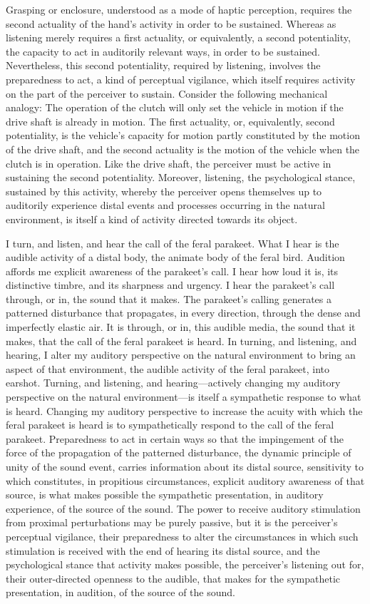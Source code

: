 Grasping or enclosure, understood as a mode of haptic perception, requires the second actuality of the hand's activity in order to be sustained. Whereas as listening merely requires a first actuality, or equivalently, a second potentiality, the capacity to act in auditorily relevant ways, in order to be sustained. Nevertheless, this second potentiality, required by listening, involves the preparedness to act, a kind of perceptual vigilance, which itself requires activity on the part of the perceiver to sustain. Consider the following mechanical analogy: The operation of the clutch will only set the vehicle in motion if the drive shaft is already in motion. The first actuality, or, equivalently, second potentiality, is the vehicle's capacity for motion partly constituted by the motion of the drive shaft, and the second actuality is the motion of the vehicle when the clutch is in operation. Like the drive shaft, the perceiver must be active in sustaining the second potentiality. Moreover, listening, the psychological stance, sustained by this activity, whereby the perceiver opens themselves up to auditorily experience distal events and processes occurring in the natural environment, is itself a kind of activity directed towards its object.

I turn, and listen, and hear the call of the feral parakeet. What I hear is the audible activity of a distal body, the animate body of the feral bird. Audition affords me explicit awareness of the parakeet's call. I hear how loud it is, its distinctive timbre, and its sharpness and urgency. I hear the parakeet's call through, or in, the sound that it makes. The parakeet's calling generates a patterned disturbance that propagates, in every direction, through the dense and imperfectly elastic air. It is through, or in, this audible media, the sound that it makes, that the call of the feral parakeet is heard. In turning, and listening, and hearing, I alter my auditory perspective on the natural environment to bring an aspect of that environment, the audible activity of the feral parakeet, into earshot. Turning, and listening, and hearing---actively changing my auditory perspective on the natural environment---is itself a sympathetic response to what is heard. Changing my auditory perspective to increase the acuity with which the feral parakeet is heard is to sympathetically respond to the call of the feral parakeet. Preparedness to act in certain ways so that the impingement of the force of the propagation of the patterned disturbance, the dynamic principle of unity of the sound event, carries information about its distal source, sensitivity to which constitutes, in propitious circumstances, explicit auditory awareness of that source, is what makes possible the sympathetic presentation, in auditory experience, of the source of the sound. The power to receive auditory stimulation from proximal perturbations may be purely passive, but it is the perceiver's perceptual vigilance, their preparedness to alter the circumstances in which such stimulation is received with the end of hearing its distal source, and the psychological stance that activity makes possible, the perceiver's listening out for, their outer-directed openness to the audible, that makes for the sympathetic presentation, in audition, of the source of the sound.



